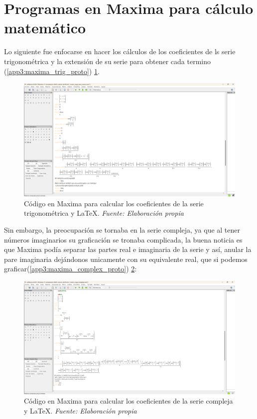 \section{Programas en Maxima para cálculo matemático}
Lo siguiente fue enfocarse en hacer los cálculos de los coeficientes de ls serie trigonométrica y la extensión de su serie para obtener cada termino (\ref{app3:maxima_trig_proto}) \ref{fig:prueba_maxima_trig}.
\begin{figure}[H]
	\centering
	\includegraphics[width=1\textwidth]{img/chapter06/prueba_maxima_trig.png}
	\caption[Código en Maxima para calcular los coeficientes de la serie trigonométrica y \LaTeX.]{Código en Maxima para calcular los coeficientes de la serie trigonométrica y \LaTeX. \textit{Fuente: Elaboración propia}}
	\label{fig:prueba_maxima_trig}
\end{figure}
Sin embargo, la preocupación se tornaba en la serie compleja, ya que al tener números imaginarios su graficación se tronaba complicada, la buena noticia es que Maxima podía separar las partes real e imaginaria de la serie y así, anular la pare imaginaria dejándonos unicamente con su equivalente real, que si podemos graficar(\ref{app3:maxima_complex_proto}) \ref{fig:prueba_maxima_complex}:
\begin{figure}[H]
	\centering
	\includegraphics[width=1\textwidth]{img/chapter06/prueba_maxima_complex.png}
	\caption[Código en Maxima para calcular los coeficientes de la serie compleja y \LaTeX.]{Código en Maxima para calcular los coeficientes de la serie compleja y \LaTeX. \textit{Fuente: Elaboración propia}}
	\label{fig:prueba_maxima_complex}
\end{figure}

